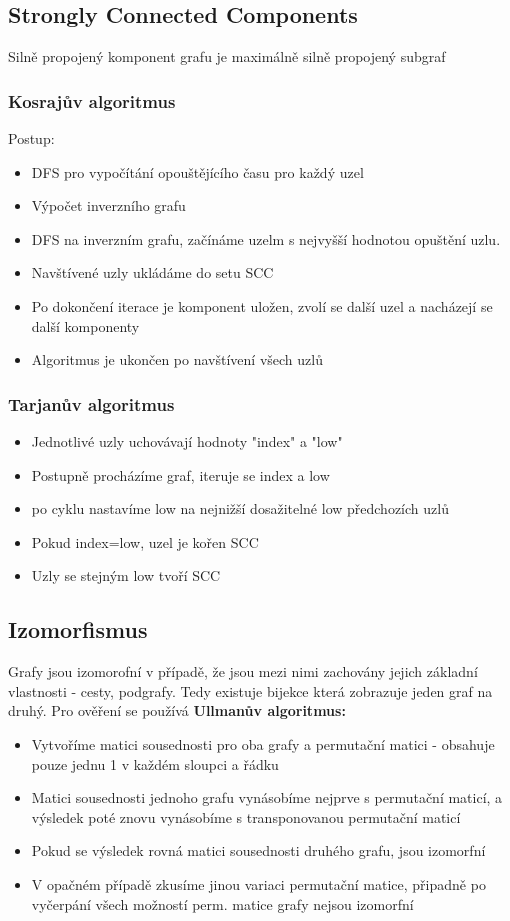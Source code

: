 \subsection{Strongly Connected Components}
Silně propojený komponent grafu je maximálně silně propojený subgraf
\subsubsection{Kosrajův algoritmus}
Postup:
\begin{itemize}
    \item DFS pro vypočítání opouštějícího času pro každý uzel
    \item Výpočet inverzního grafu
    \item DFS na inverzním grafu, začínáme uzelm s nejvyšší hodnotou opuštění uzlu.
    \item Navštívené uzly ukládáme do setu SCC
    \item Po dokončení iterace je komponent uložen, zvolí se další uzel a nacházejí se další komponenty
    \item Algoritmus je ukončen po navštívení všech uzlů
\end{itemize}
\subsubsection{Tarjanův algoritmus}
\begin{itemize}
    \item Jednotlivé uzly uchovávají hodnoty "index" a "low"
    \item Postupně procházíme graf, iteruje se index a low
    \item po cyklu nastavíme low na nejnižší dosažitelné low předchozích uzlů
    \item Pokud index=low, uzel je kořen SCC
    \item Uzly se stejným low tvoří SCC
\end{itemize}
\subsection{Izomorfismus}
Grafy jsou izomorofní v případě, že jsou mezi nimi zachovány jejich základní vlastnosti - cesty, podgrafy. Tedy existuje bijekce která zobrazuje jeden graf na druhý.
Pro ověření se používá \textbf{Ullmanův algoritmus:}
\begin{itemize}
    \item Vytvoříme matici sousednosti pro oba grafy a permutační matici - obsahuje pouze jednu 1 v každém sloupci a řádku
    \item Matici sousednosti jednoho grafu vynásobíme nejprve s permutační maticí, a výsledek poté znovu vynásobíme s transponovanou permutační maticí
    \item Pokud se výsledek rovná matici sousednosti druhého grafu, jsou izomorfní
    \item V opačném případě zkusíme jinou variaci permutační matice, připadně po vyčerpání všech možností perm. matice grafy nejsou izomorfní
\end{itemize}